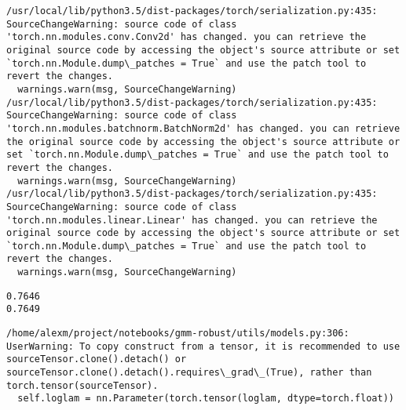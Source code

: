 \documentclass[11pt]{article}
\begin{document}
    \begin{Verbatim}[commandchars=\\\{\}]
/usr/local/lib/python3.5/dist-packages/torch/serialization.py:435: SourceChangeWarning: source code of class 'torch.nn.modules.conv.Conv2d' has changed. you can retrieve the original source code by accessing the object's source attribute or set `torch.nn.Module.dump\_patches = True` and use the patch tool to revert the changes.
  warnings.warn(msg, SourceChangeWarning)
/usr/local/lib/python3.5/dist-packages/torch/serialization.py:435: SourceChangeWarning: source code of class 'torch.nn.modules.batchnorm.BatchNorm2d' has changed. you can retrieve the original source code by accessing the object's source attribute or set `torch.nn.Module.dump\_patches = True` and use the patch tool to revert the changes.
  warnings.warn(msg, SourceChangeWarning)
/usr/local/lib/python3.5/dist-packages/torch/serialization.py:435: SourceChangeWarning: source code of class 'torch.nn.modules.linear.Linear' has changed. you can retrieve the original source code by accessing the object's source attribute or set `torch.nn.Module.dump\_patches = True` and use the patch tool to revert the changes.
  warnings.warn(msg, SourceChangeWarning)

    \end{Verbatim}

    \begin{Verbatim}[commandchars=\\\{\}]
0.7646
0.7649

    \end{Verbatim}

    \begin{Verbatim}[commandchars=\\\{\}]
/home/alexm/project/notebooks/gmm-robust/utils/models.py:306: UserWarning: To copy construct from a tensor, it is recommended to use sourceTensor.clone().detach() or sourceTensor.clone().detach().requires\_grad\_(True), rather than torch.tensor(sourceTensor).
  self.loglam = nn.Parameter(torch.tensor(loglam, dtype=torch.float))

    \end{Verbatim}
\end{document}
